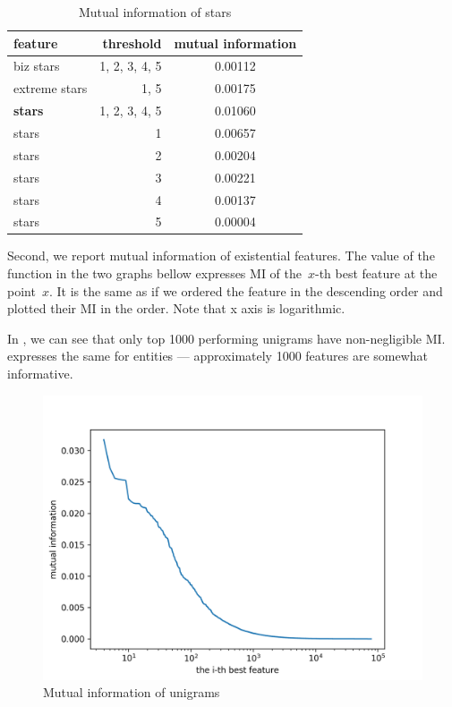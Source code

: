 \begin{table}[h!]
\centering
\begin{tabular}{lrS[table-format=3.2]}
\toprule
\textbf{feature} & \textbf{threshold} & \textbf{mutual information} \\
\midrule
biz stars & 1, 2, 3, 4, 5 & 0.00112 \\
extreme stars & 1, 5 & 0.00175 \\
\textbf{stars} & 1, 2, 3, 4, 5& 0.01060 \\
stars & 1 & 0.00657 \\
stars & 2 & 0.00204 \\
stars & 3 & 0.00221 \\
stars & 4 & 0.00137 \\
stars & 5 & 0.00004 \\
\bottomrule
\end{tabular}

\caption{Mutual information of stars}\label{tab:mi_stars}
\end{table}


Second, we report mutual information of existential features.
The value of the function in the two graphs bellow expresses
MI of the~$x$-th best feature at the point~$x$.
It is the same as if we ordered the feature in the descending order
and plotted their MI in the order.
Note that x axis is logarithmic.

In ,
we can see that only top 1000 performing unigrams have non-negligible MI.
 expresses the same for entities
--- approximately 1000 features are somewhat informative.


\begin{figure}[ht]\centering
\includegraphics[width=130mm]{figures/unigrams.png}
\caption{Mutual information of unigrams}
\label{fig:mi_unigrams}
\end{figure}


